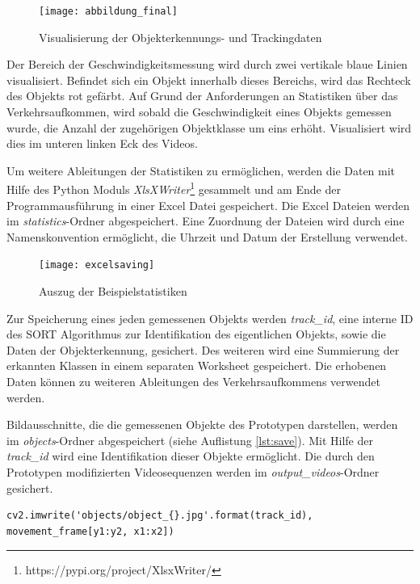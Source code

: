 \begin{figure}[htb]
	\centering
	\texttt{[image: abbildung\_final]}
	\caption{Visualisierung der Objekterkennungs- und Trackingdaten}
	\label{fig:visual}
\end{figure}

Der Bereich der Geschwindigkeitsmessung wird durch zwei vertikale blaue Linien visualisiert. Befindet sich ein Objekt innerhalb dieses Bereichs, wird das Rechteck des Objekts rot gefärbt. Auf Grund der Anforderungen an Statistiken über das Verkehrsaufkommen, wird sobald die Geschwindigkeit eines Objekts gemessen wurde, die Anzahl der zugehörigen Objektklasse um eins erhöht. Visualisiert wird dies im unteren linken Eck des Videos. 

Um weitere Ableitungen der Statistiken zu ermöglichen, werden die Daten mit Hilfe des Python Moduls \emph{XlsXWriter}\footnote{https://pypi.org/project/XlsxWriter/} gesammelt und am Ende der Programmausführung in einer Excel Datei gespeichert. Die Excel Dateien werden im \emph{statistics}-Ordner abgespeichert. Eine Zuordnung der Dateien wird durch eine Namenskonvention ermöglicht, die Uhrzeit und Datum der Erstellung verwendet.

\begin{figure}[htb]
	\centering
	\texttt{[image: excelsaving]}
	\caption{Auszug der Beispielstatistiken}
	\label{fig:excelsaving}
\end{figure}

Zur Speicherung eines jeden gemessenen Objekts werden \emph{track\_id}, eine interne ID des \ac{SORT} Algorithmus zur Identifikation des eigentlichen Objekts, sowie die Daten der Objekterkennung, gesichert. Des weiteren wird eine Summierung der erkannten Klassen in einem separaten Worksheet gespeichert. Die erhobenen Daten können zu weiteren Ableitungen des Verkehrsaufkommens verwendet werden. 

Bildausschnitte, die die gemessenen Objekte des Prototypen darstellen, werden im \emph{objects}-Ordner abgespeichert (siehe Auflistung \ref{lst:save}). Mit Hilfe der \emph{track\_id} wird eine Identifikation dieser Objekte ermöglicht. Die durch den Prototypen modifizierten Videosequenzen werden im \emph{output\_videos}-Ordner gesichert.

\vspace*{5mm}
\begin{lstlisting}[caption={Speichern eines Bildausschnittes}, label={lst:save}]
cv2.imwrite('objects/object_{}.jpg'.format(track_id), movement_frame[y1:y2, x1:x2])
\end{lstlisting}





